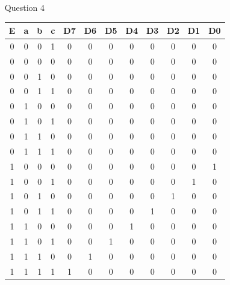 \documentclass{article}
\begin{document}
\begin{itemize}
	\item[Question 4]\hspace{0pt}\\

	

	\begin{tabular}{ c c c c | c c c c c c c c }
	E & a & b & c & D7 & D6 & D5 & D4 & D3 & D2 & D1 & D0 \\\hline
	0 & 0 & 0 & 1 & 0 & 0 & 0 & 0 & 0 & 0 & 0 & 0 \\
	0 & 0 & 0 & 0 & 0 & 0 & 0 & 0 & 0 & 0 & 0 & 0 \\
	0 & 0 & 1 & 0 & 0 & 0 & 0 & 0 & 0 & 0 & 0 & 0 \\
	0 & 0 & 1 & 1 & 0 & 0 & 0 & 0 & 0 & 0 & 0 & 0 \\
	0 & 1 & 0 & 0 & 0 & 0 & 0 & 0 & 0 & 0 & 0 & 0 \\
	0 & 1 & 0 & 1 & 0 & 0 & 0 & 0 & 0 & 0 & 0 & 0 \\
	0 & 1 & 1 & 0 & 0 & 0 & 0 & 0 & 0 & 0 & 0 & 0 \\
	0 & 1 & 1 & 1 & 0 & 0 & 0 & 0 & 0 & 0 & 0 & 0 \\
	1 & 0 & 0 & 0 & 0 & 0 & 0 & 0 & 0 & 0 & 0 & 1 \\
	1 & 0 & 0 & 1 & 0 & 0 & 0 & 0 & 0 & 0 & 1 & 0 \\
	1 & 0 & 1 & 0 & 0 & 0 & 0 & 0 & 0 & 1 & 0 & 0 \\
	1 & 0 & 1 & 1 & 0 & 0 & 0 & 0 & 1 & 0 & 0 & 0 \\
	1 & 1 & 0 & 0 & 0 & 0 & 0 & 1 & 0 & 0 & 0 & 0 \\
	1 & 1 & 0 & 1 & 0 & 0 & 1 & 0 & 0 & 0 & 0 & 0 \\
	1 & 1 & 1 & 0 & 0 & 1 & 0 & 0 & 0 & 0 & 0 & 0 \\
	1 & 1 & 1 & 1 & 1 & 0 & 0 & 0 & 0 & 0 & 0 & 0 \\
	\end{tabular}

\end{itemize}
\end{document}
